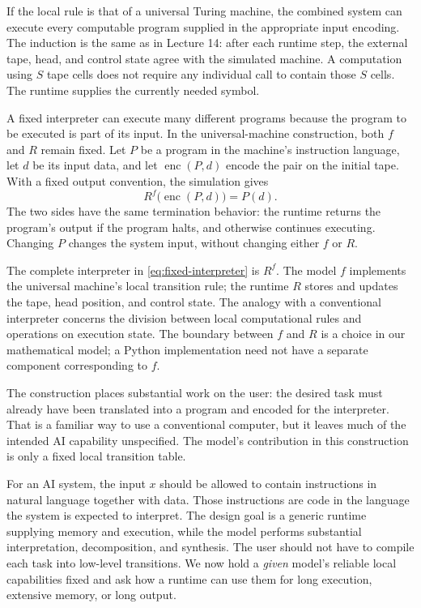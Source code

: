 \documentclass[11pt,twoside]{article}
\theoremstyle{definition}
\theoremstyle{remark}
\begin{document}
If the local rule is that of a universal Turing machine, the combined system
can execute every computable program supplied in the appropriate input
encoding. The induction is the same as in Lecture 14: after each runtime
step, the external tape, head, and control state agree with the simulated
machine. A computation using $S$ tape cells does not require any individual
call to contain those $S$ cells. The runtime supplies the currently needed
symbol.

A fixed interpreter can execute many different programs because the program
to be executed is part of its input. In the universal-machine construction,
both $f$ and $R$ remain fixed. Let $P$ be a program in the machine's instruction
language, let $d$ be its input data, and let $\operatorname{enc}(P,d)$ encode
the pair on the initial tape. With a fixed output convention, the simulation
gives
\begin{equation}
 R^f\bigl(\operatorname{enc}(P,d)\bigr)=P(d).
 \label{eq:fixed-interpreter}
\end{equation}
The two sides have the same termination behavior: the runtime returns the
program's output if the program halts, and otherwise continues executing.
Changing $P$ changes the system input, without changing either $f$ or $R$.

The complete interpreter in \eqref{eq:fixed-interpreter} is $R^f$.
The model $f$ implements the universal machine's local transition rule;
the runtime $R$ stores and updates the tape, head position, and control
state. The analogy with a conventional interpreter concerns the division
between local computational rules and operations on execution state. The boundary
between $f$ and $R$ is a choice in our mathematical model; a Python
implementation need not have a separate component corresponding to $f$.

The construction places substantial work on the user: the desired task
must already have been translated into a program and encoded for the
interpreter. That is a familiar way to use a conventional computer, but
it leaves much of the intended AI capability unspecified. The model's
contribution in this construction is only a fixed local transition table.

For an AI system, the input $x$ should be allowed to contain instructions
in natural language together with data. Those instructions are code in
the language the system is expected to interpret. The design goal is a
generic runtime supplying memory and execution, while the model performs
substantial interpretation, decomposition, and synthesis. The user should
not have to compile each task into low-level transitions. We now hold a
\emph{given} model's reliable local capabilities fixed and ask how a
runtime can use them for long execution, extensive memory, or long output.
\end{document}
